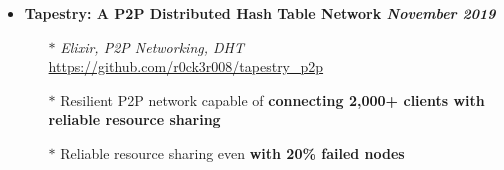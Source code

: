 \documentclass[10]{Resume}
\begin{document}
\begin{itemize}[noitemsep,nolistsep]
	\item\textbf{Tapestry: A P2P Distributed Hash Table Network \hfill \textit{November 2019}}
		\begin{itemize}[leftmargin=*]
			\setlength\itemsep{-0.25em}
			\item[$\ast$]\textit{Elixir, P2P Networking, DHT} \hfill \href{https://github.com/r0ck3r008/tapestry\_p2p}{{\scriptsize https://github.com/r0ck3r008/tapestry\_p2p}}
			\item[$\ast$]Resilient P2P network capable of \textbf{connecting 2,000+ clients with reliable resource sharing}
			\item[$\ast$]Reliable resource sharing even \textbf{with 20\% failed nodes}
		\end{itemize}

\end{itemize}
\end{document}
